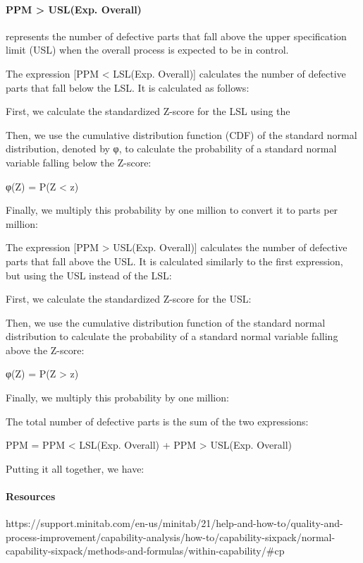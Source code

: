 \documentclass[11pt]{article}
\begin{document}
\paragraph{PPM \textgreater{} USL(Exp. Overall)} represents the number of defective
parts that fall above the upper specification limit (USL) when the
overall process is expected to be in control.

The expression {[}PPM \textless{} LSL(Exp. Overall){]} calculates the
number of defective parts that fall below the LSL. It is calculated as
follows:

First, we calculate the standardized Z-score for the LSL using the


Then, we use the cumulative distribution function (CDF) of the standard
normal distribution, denoted by φ, to calculate the probability of a
standard normal variable falling below the Z-score:

φ(Z) = P(Z \textless{} z)

Finally, we multiply this probability by one million to convert it to
parts per million:

The expression {[}PPM \textgreater{} USL(Exp. Overall){]} calculates the
number of defective parts that fall above the USL. It is calculated
similarly to the first expression, but using the USL instead of the LSL:

First, we calculate the standardized Z-score for the USL:

Then, we use the cumulative distribution function of the standard normal
distribution to calculate the probability of a standard normal variable
falling above the Z-score:

φ(Z) = P(Z \textgreater{} z)

Finally, we multiply this probability by one million:

The total number of defective parts is the sum of the two expressions:

PPM = PPM \textless{} LSL(Exp. Overall) + PPM \textgreater{} USL(Exp.
Overall)

Putting it all together, we have:

\hypertarget{resources}{%
\paragraph{Resources}\label{resources}}

https://support.minitab.com/en-us/minitab/21/help-and-how-to/quality-and-process-improvement/capability-analysis/how-to/capability-sixpack/normal-capability-sixpack/methods-and-formulas/within-capability/\#cp
\end{document}
